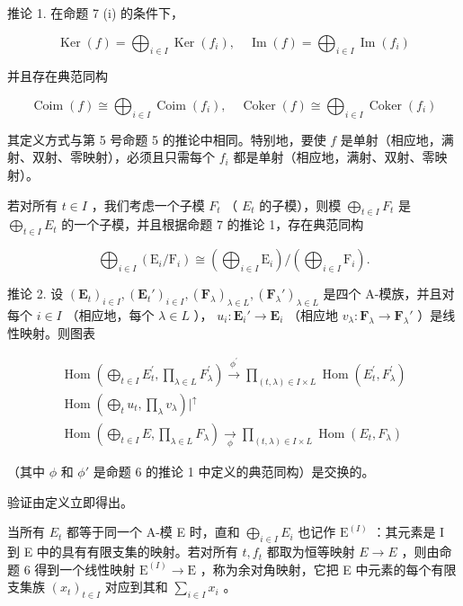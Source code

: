 推论 1. 在命题 7 (i) 的条件下，

\[
\operatorname{Ker} (f) = \bigoplus_ {i \in I} \operatorname{Ker} (f _ {i}), \quad \operatorname{Im} (f) = \bigoplus_ {i \in I} \operatorname{Im} (f _ {i})\tag{25}
\]

并且存在典范同构

\[
\operatorname{Coim} (f) \cong \bigoplus_ {i \in I} \operatorname{Coim} (f _ {i}), \quad \operatorname{Coker} (f) \cong \bigoplus_ {i \in I} \operatorname{Coker} (f _ {i})
\]

其定义方式与第 5 号命题 5 的推论中相同。特别地，要使 \(f\) 是单射（相应地，满射、双射、零映射），必须且只需每个 \(f_i\) 都是单射（相应地，满射、双射、零映射）。

若对所有 \(t \in I\) ，我们考虑一个子模 \(F_t\) （ \(E_t\) 的子模），则模 \(\bigoplus_{t \in I} F_t\) 是 \(\bigoplus_{t \in I} E_t\) 的一个子模，并且根据命题 7 的推论 1，存在典范同构

\[
\bigoplus_ {i \in I} \left(\mathrm{E} _ {i} / \mathrm{F} _ {i}\right)\cong \left(\bigoplus_ {i \in I} \mathrm{E} _ {i}\right) / \left(\bigoplus_ {i \in I} \mathrm{F} _ {i}\right).\tag{26}
\]

推论 2. 设 \((\mathbf{E}_t)_{i \in I}, (\mathbf{E}_t')_{i \in I}, (\mathbf{F}_\lambda)_{\lambda \in L}, (\mathbf{F}_\lambda')_{\lambda \in L}\) 是四个 A-模族，并且对每个 \(i \in I\) （相应地，每个 \(\lambda \in L\) ）， \(u_i: \mathbf{E}_i' \to \mathbf{E}_i\) （相应地 \(v_\lambda: \mathbf{F}_\lambda \to \mathbf{F}_\lambda'\) ）是线性映射。则图表

\[
\begin{array}{c} \operatorname{Hom} \left(\bigoplus_ {t \in I} E _ {t} ^ {\prime}, \prod_ {\lambda \in L} F _ {\lambda} ^ {\prime}\right) \xrightarrow {\phi^ {\prime}} \prod_ {(t, \lambda) \in I \times L} \operatorname{Hom} (E _ {t} ^ {\prime}, F _ {\lambda} ^ {\prime}) \\ \operatorname{Hom} \left(\bigoplus_ {t} u _ {t}, \prod_ {\lambda} v _ {\lambda}\right) \Bigg | ^ {\uparrow} \\ \operatorname{Hom} \left(\bigoplus_ {t \in I} E, \prod_ {\lambda \in L} F _ {\lambda}\right) \xrightarrow [ \phi ]{\quad} \prod_ {(t, \lambda) \in I \times L} \operatorname{Hom} (E _ {t}, F _ {\lambda}) \end{array}
\]

（其中 \(\phi\) 和 \(\phi'\) 是命题 6 的推论 1 中定义的典范同构）是交换的。

验证由定义立即得出。

当所有 \(E_{t}\) 都等于同一个 A-模 E 时，直和 \(\bigoplus_{i\in I}E_{i}\) 也记作 \(\mathrm{E}^{(I)}\) ：其元素是 I 到 E 中的具有有限支集的映射。若对所有 \(t,f_{t}\) 都取为恒等映射 \(E\to E\) ，则由命题 6 得到一个线性映射 \(\mathrm{E}^{(I)}\to\mathrm{E}\) ，称为余对角映射，它把 E 中元素的每个有限支集族 \((x_{t})_{t\in I}\) 对应到其和 \(\sum_{i\in I}x_{i}\) 。

